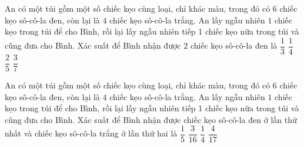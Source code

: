 \begin{ex}
	An có một túi gồm một số chiếc kẹo cùng loại, chỉ khác màu, trong đó có $6$ chiếc kẹo sô-cô-la đen, còn lại là $4$ chiếc kẹo sô-cô-la trắng. An lấy ngẫu nhiên $1$ chiếc kẹo trong túi để cho Bình, rồi lại lấy ngẫu nhiên tiếp 1 chiếc kẹo nữa trong túi và cũng đưa cho Bình. Xác suất để Bình nhận được $2$ chiếc kẹo sô-cô-la đen là
	\choice
	{\True $\dfrac{1}{3} $}
	{$ \dfrac{1}{4}$}
	{$ \dfrac{2}{5}$}
	{$ \dfrac{3}{7}$}
\end{ex}

\begin{ex}
	An có một túi gồm một số chiếc kẹo cùng loại, chỉ khác màu, trong đó có $6$ chiếc kẹo sô-cô-la đen, còn lại là $4$ chiếc kẹo sô-cô-la trắng. An lấy ngẫu nhiên $1$ chiếc kẹo trong túi để cho Bình, rồi lại lấy ngẫu nhiên tiếp 1 chiếc kẹo nữa trong túi và cũng đưa cho Bình. Xác suất để Bình nhận được chiếc kẹo sô-cô-la đen ở lần thứ nhất và chiếc kẹo sô-cô-la trắng ở lần thứ hai là
	\choice
	{$\dfrac{1}{5} $}
	{$ \dfrac{3}{16}$}
	{$ \dfrac{1}{4}$}
	{$ \dfrac{4}{17}$}
\end{ex}

